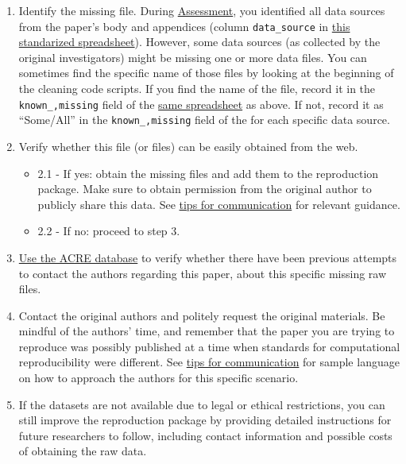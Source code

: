 \documentclass[]{book}
\providecommand{\tightlist}{%
  \setlength{\itemsep}{0pt}\setlength{\parskip}{0pt}}
\begin{document}
\begin{enumerate}
\def\labelenumi{\arabic{enumi}.}
\tightlist
\item
  Identify the missing file. During \protect\hyperlink{assessment}{Assessment}, you identified all data sources from the paper's body and appendices (column \texttt{data\_source} in \href{https://docs.google.com/spreadsheets/d/1LUIdVFH0OfR70C7z07TYeE-uWzKI_JIeWUMaYhqEKK0/edit\#gid=0\&range=A1}{this standarized spreadsheet}). However, some data sources (as collected by the original investigators) might be missing one or more data files. You can sometimes find the specific name of those files by looking at the beginning of the cleaning code scripts. If you find the name of the file, record it in the \texttt{known\_,missing} field of the \href{https://docs.google.com/spreadsheets/d/1LUIdVFH0OfR70C7z07TYeE-uWzKI_JIeWUMaYhqEKK0/edit\#gid=0\&range=A1}{same spreadsheet} as above. If not, record it as ``Some/All'' in the \texttt{known\_,missing} field of the for each specific data source.\\
\item
  Verify whether this file (or files) can be easily obtained from the web.

  \begin{itemize}
  \tightlist
  \item
    2.1 - If yes: obtain the missing files and add them to the reproduction package. Make sure to obtain permission from the original author to publicly share this data. See \protect\hyperlink{tips-for-communication}{tips for communication} for relevant guidance.\\
  \item
    2.2 - If no: proceed to step 3.\\
  \end{itemize}
\item
  \href{ADD\%20LINK}{Use the ACRE database} to verify whether there have been previous attempts to contact the authors regarding this paper, about this specific missing raw files.\\
\item
  Contact the original authors and politely request the original materials. Be mindful of the authors' time, and remember that the paper you are trying to reproduce was possibly published at a time when standards for computational reproducibility were different. See \protect\hyperlink{tips-for-communication}{tips for communication} for sample language on how to approach the authors for this specific scenario.\\
\item
  If the datasets are not available due to legal or ethical restrictions, you can still improve the reproduction package by providing detailed instructions for future researchers to follow, including contact information and possible costs of obtaining the raw data.
\end{enumerate}
\end{document}
